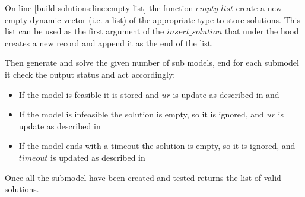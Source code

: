 On line \ref{build-solutions:line:empty-list} the function $empty\_list$ create a new empty dynamic vector 
(i.e. a \href{https://en.wikipedia.org/wiki/List_(abstract_data_type)}{list}) of the appropriate type to store solutions. This list can be used as the first argument of 
the $insert\_solution$ that under the hood creates a new record and append it as the end of the list. 

Then  generate and solve the given number of sub models, end for each submodel it check the output status and act accordingly:
\begin{itemize}
    \item If the model is feasible it is stored and $ur$ is update as described in  and 
    \item If the model is infeasible the solution is empty, so it is ignored, and $ur$ is update as described in 
    \item If the model ends with a timeout the solution is empty, so it is ignored, and $timeout$ is updated as described in 
\end{itemize}

Once all the submodel have been created and tested  returns the list of valid solutions.
